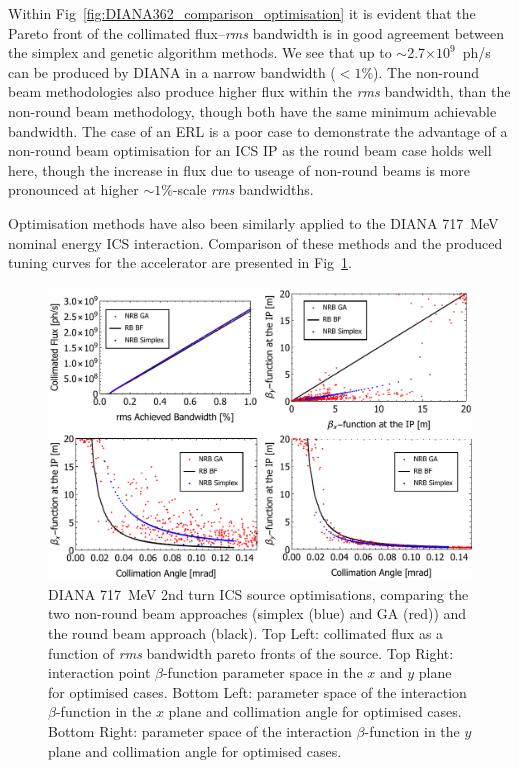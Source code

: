 \documentclass[../main.tex]{subfiles}
\begin{document}
Within Fig~\ref{fig:DIANA362_comparison_optimisation} it is evident that the Pareto front of the collimated flux--\textit{rms} bandwidth is in good agreement between the simplex and genetic algorithm methods. We see that up to $\sim$2.7$\times 10^{9}$~ph/\si{\second} can be produced by DIANA in a narrow bandwidth ($<1$\%). The non-round beam methodologies also produce higher flux within the \textit{rms} bandwidth, than the non-round beam methodology, though both have the same minimum achievable bandwidth. The case of an ERL is a poor case to demonstrate the advantage of a non-round beam optimisation for an ICS IP as the round beam case holds well here, though the increase in flux due to useage of non-round beams is more pronounced at higher $\sim1$\%-scale \textit{rms} bandwidths. 

   

Optimisation methods have also been similarly applied to the DIANA 717~\si{\mega\electronvolt} nominal energy ICS interaction. Comparison of these methods and the produced tuning curves for the accelerator are presented in Fig~\ref{fig:DIANA717_comparison_optimisation}.

\begin{figure}[!h]
\centering
\includegraphics[width=\textwidth]{Figures/DIANA_Inverse_Compton_Source_Design/DIANA_Tuning_Curve_Opt/DIANA717fullcomp.pdf}
\caption{DIANA 717~\si{\mega\electronvolt} 2nd turn ICS source optimisations, comparing the two non-round beam approaches (simplex (blue) and GA (red)) and the round beam approach (black). Top Left: collimated flux as a function of \textit{rms} bandwidth pareto fronts of the source. Top Right: interaction point $\beta$-function parameter space in the $x$ and $y$ plane for optimised cases. Bottom Left: parameter space of the interaction $\beta$-function in the $x$ plane and collimation angle for optimised cases. Bottom Right: parameter space of the interaction $\beta$-function in the $y$ plane and collimation angle for optimised cases.}
\label{fig:DIANA717_comparison_optimisation}
\end{figure}
\end{document}
